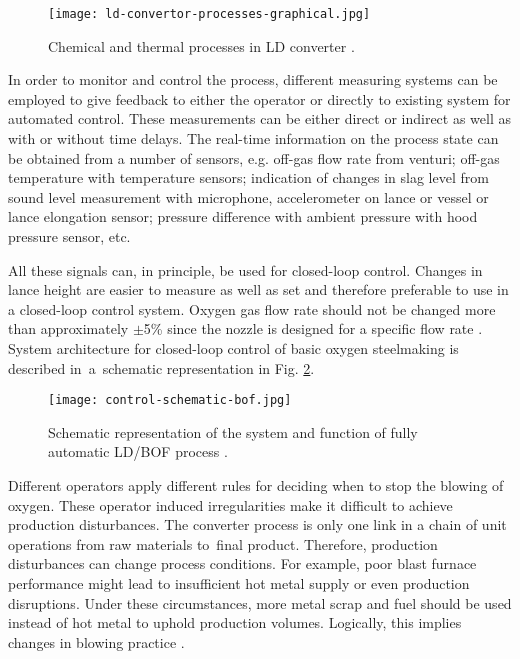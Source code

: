 \begin{figure}[ht!]
	\centering
	\texttt{[image: ld-convertor-processes-graphical.jpg]}
	\caption{Chemical and thermal processes in LD converter \citep{Jalkanen2006}.}
	\label{o:25}
\end{figure}

In order to monitor and control the process, different measuring systems can be employed to give feedback to either the operator or directly to existing system for automated control. These measurements can be either direct or indirect as well as with or without time delays. The real-time information on the process state can be obtained from a number of sensors, e.g. off-gas flow rate from venturi; off-gas temperature with temperature sensors; indication of changes in slag level from sound level measurement with microphone, accelerometer on lance or vessel or lance elongation sensor; pressure difference with ambient pressure with hood pressure sensor, etc.

All these signals can, in principle, be used for closed-loop control. Changes in lance height are easier to measure as well as set and therefore preferable to use in a closed-loop control system. Oxygen gas flow rate should not be changed more than approximately $\pm$5\% since the nozzle is designed for a specific flow rate \citep{Widlund1998}. System architecture for closed-loop control of basic oxygen steelmaking is described in~a~schematic representation in Fig. \ref{o:i31}.

\begin{figure}[ht!]
	\centering
	\texttt{[image: control-schematic-bof.jpg]}
	\caption{Schematic representation of the system and function of fully automatic LD/BOF process \citep{Turkdogan1996}.}
	\label{o:i31}
\end{figure}

Different operators apply different rules for deciding when to stop the blowing of oxygen. These operator induced irregularities make it difficult to achieve production disturbances. The converter process is only one link in a chain of unit operations from raw materials to~final product. Therefore, production disturbances can change process conditions. For example, poor blast furnace performance might lead to insufficient hot metal supply or even production disruptions. Under these circumstances, more metal scrap and fuel should be used instead of hot metal to uphold production volumes. Logically, this implies changes in blowing practice \citep{Widlund1998}.